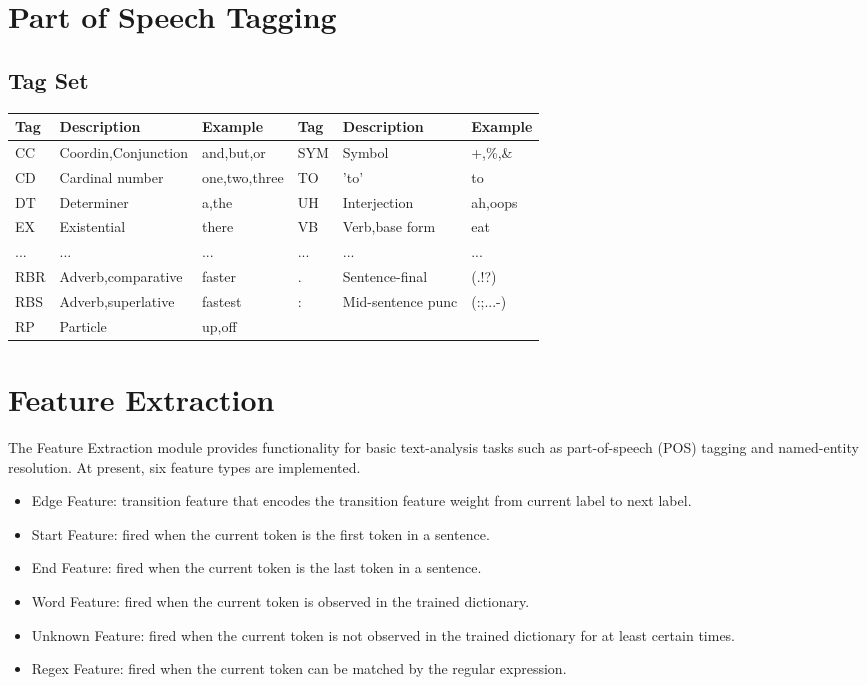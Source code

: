 \section{Part of Speech Tagging}

\subsection{Tag Set}
\begin{tabular}{lll||lll}
  Tag & Description         & Example       & Tag & Description         & Example\\
  \hline                        
  CC  & Coordin,Conjunction & and,but,or    & SYM & Symbol              & +,\%,\&\\
  CD  & Cardinal number     & one,two,three & TO  & 'to'                & to\\
  DT  & Determiner          & a,the         & UH  & Interjection        & ah,oops\\
  EX  & Existential         & there         & VB  & Verb,base form      & eat\\
  ... & ...                 & ...           & ... & ...                 & ...\\
  RBR & Adverb,comparative  & faster        & .   & Sentence-final      & (.!?)\\
  RBS & Adverb,superlative  & fastest       & :   & Mid-sentence punc   & (:;...-)\\
  RP  & Particle            & up,off        &     &                     &\\
  \hline  
\end{tabular}

\section{Feature Extraction}
The Feature Extraction module provides functionality for basic text-analysis
tasks such as part-of-speech (POS) tagging and named-entity resolution.
At present, six feature types are implemented.
    \begin{itemize}
    \item Edge Feature: transition feature that encodes the transition feature weight from current label to next label.
    \item Start Feature: fired when the current token is the first token in a sentence.
    \item End Feature: fired when the current token is the last token in a sentence.
    \item Word Feature: fired when the current token is observed in the trained dictionary.
    \item Unknown Feature: fired when the current token is not observed in the trained dictionary for at least certain times.
    \item Regex Feature: fired when the current token can be matched by the regular expression.
    \end{itemize}

